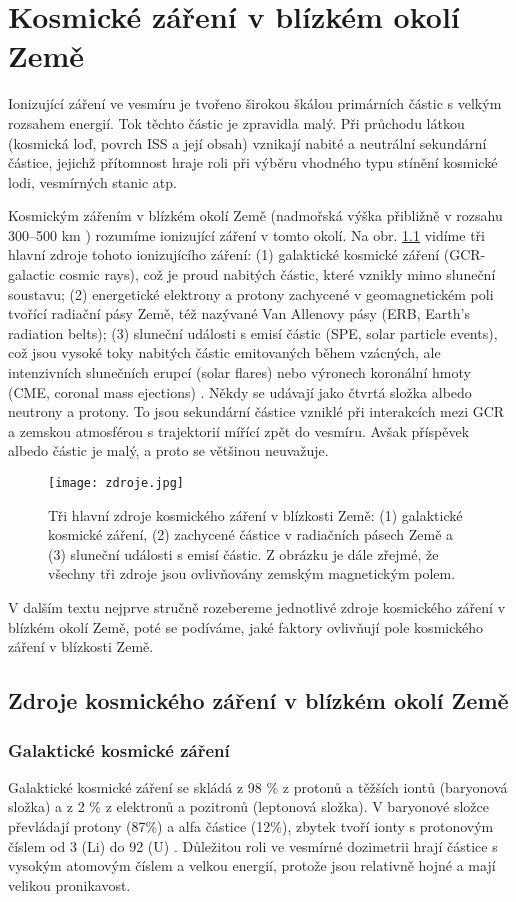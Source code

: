 \chapter{Kosmické záření v blízkém okolí Země}
Ionizující záření ve vesmíru je tvořeno širokou škálou primárních částic s velkým rozsahem energií. Tok těchto částic je zpravidla malý. Při průchodu látkou (kosmická loď, povrch ISS a její obsah) vznikají nabité a neutrální sekundární částice, jejichž přítomnost hraje roli při výběru vhodného typu stínění kosmické lodi, vesmírných stanic atp.   

Kosmickým zářením v blízkém okolí Země (nadmořská výška přibližně v rozsahu 300--500 km \cite{japonsky}) rozumíme ionizující záření v tomto okolí. Na obr. \ref{fig:zdroje} vidíme tři hlavní zdroje tohoto ionizujícího záření: (1) galaktické kosmické záření (GCR-galactic cosmic rays), což je proud nabitých částic, které vznikly mimo sluneční soustavu; (2) energetické elektrony a protony zachycené v geomagnetickém poli tvořící radiační pásy Země, též nazývané Van Allenovy pásy (ERB, Earth's radiation belts); (3) sluneční události s emisí částic (SPE, solar particle events), což jsou vysoké toky nabitých částic emitovaných během vzácných, ale intenzivních slunečních erupcí (solar flares) nebo výronech koronální hmoty (CME, coronal mass ejections) \cite{benton}. Někdy se udávají jako čtvrtá
složka albedo neutrony a protony. To jsou sekundární částice vzniklé při interakcích mezi GCR a zemskou atmosférou s trajektorií mířící zpět do vesmíru. Avšak příspěvek albedo částic je malý, a proto se většinou neuvažuje.

\begin{figure}[ht]
  \centering
  \texttt{[image: zdroje.jpg]}
  \caption{Tři hlavní zdroje kosmického záření v blízkosti Země: (1) galaktické kosmické záření, (2) zachycené částice v radiačních pásech Země a (3) sluneční události s emisí částic. Z obrázku je dále zřejmé, že všechny tři zdroje jsou ovlivňovány zemským magnetickým polem. \cite{benton}}
  \label{fig:zdroje}
\end{figure}

V dalším textu nejprve stručně rozebereme jednotlivé zdroje kosmického záření v blízkém okolí Země, poté se podíváme, jaké faktory ovlivňují pole kosmického záření v blízkosti Země.
\section{Zdroje kosmického záření v blízkém okolí Země}
\subsection{Galaktické kosmické záření}
Galaktické kosmické záření se skládá z 98 \% z protonů a těžších iontů (baryonová složka) a z 2 \% z elektronů a pozitronů (leptonová složka). V baryonové složce převládají protony (87\%) a alfa částice (12\%), zbytek tvoří ionty s protonovým číslem od 3 (Li) do 92 (U) \cite{benton}. Důležitou roli ve vesmírné dozimetrii hrají částice s vysokým atomovým číslem a velkou energií, protože jsou relativně hojné a mají velikou pronikavost.

